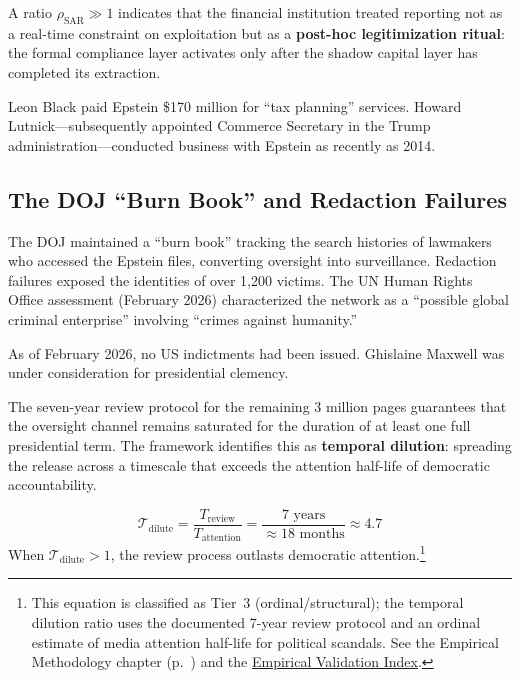 A ratio $\rho_{\text{SAR}} \gg 1$ indicates that the financial institution treated reporting not as a real-time constraint on exploitation but as a \textbf{post-hoc legitimization ritual}: the formal compliance layer activates only after the shadow capital layer has completed its extraction.

Leon Black paid Epstein \$170 million for ``tax planning'' services. Howard Lutnick---subsequently appointed Commerce Secretary in the Trump administration---conducted business with Epstein as recently as 2014.

\subsection{The DOJ ``Burn Book'' and Redaction Failures}

The DOJ maintained a ``burn book'' tracking the search histories of lawmakers who accessed the Epstein files, converting oversight into surveillance. Redaction failures exposed the identities of over 1,200 victims. The UN Human Rights Office assessment (February 2026) characterized the network as a ``possible global criminal enterprise'' involving ``crimes against humanity.''

As of February 2026, no US indictments had been issued. Ghislaine Maxwell was under consideration for presidential clemency.

The seven-year review protocol for the remaining 3 million pages guarantees that the oversight channel remains saturated for the duration of at least one full presidential term. The framework identifies this as \textbf{temporal dilution}: spreading the release across a timescale that exceeds the attention half-life of democratic accountability.

\begin{equation}\label{eq:gp12-temporal-dilution}
\mathcal{T}_{\text{dilute}} = \frac{T_{\text{review}}}{T_{\text{attention}}} = \frac{7 \text{ years}}{\approx 18 \text{ months}} \approx 4.7
\end{equation}
When $\mathcal{T}_{\text{dilute}} > 1$, the review process outlasts democratic attention.\footnote{This equation is classified as Tier~3 (ordinal/structural); the temporal dilution ratio uses the documented 7-year review protocol and an ordinal estimate of media attention half-life for political scandals. See the Empirical Methodology chapter (p.~\pageref{ch:empirical_methodology}) and the \hyperref[app:empirical_index]{Empirical Validation Index}.}

